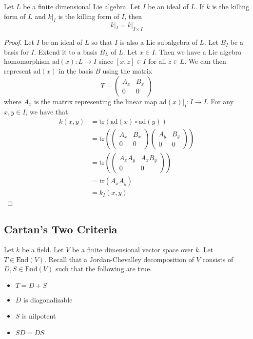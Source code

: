 \documentclass[a4paper]{article}
\begin{document}
\begin{lmm}{}{} Let $L$ be a finite dimensional Lie algebra. Let $I$ be an ideal of $L$. If $k$ is the killing form of $L$ and $k|_I$ is the killing form of $I$, then $$k|_I=k|_{I\times I}$$ \tcbline
\begin{proof}
Let $I$ be an ideal of $L$ so that $I$ is also a Lie subalgebra of $L$. Let $B_I$ be a basis for $I$. Extend it to a basis $B_L$ of $L$. Let $x\in I$. Then we have a Lie algebra homomorphism $\text{ad}(x):L\to I$ since $[x,z]\in I$ for all $z\in L$. We can then represent $\text{ad}(x)$ in the basis $B$ using the matrix $$T=\begin{pmatrix}
A_x & B_x\\
0 & 0
\end{pmatrix}$$ where $A_x$ is the matrix representing the linear map $\text{ad}(x)|_I:I\to I$. For any $x,y\in I$, we have that 
\begin{align*}
k(x,y)&=\text{tr}(\text{ad}(x)\circ\text{ad}(y))\\
&=\text{tr}\left(\begin{pmatrix}
A_x & B_x\\
0 & 0
\end{pmatrix}\begin{pmatrix}
A_y & B_y\\
0 & 0
\end{pmatrix}\right)\\
&=\text{tr}\left(\begin{pmatrix}
A_xA_y & A_xB_y\\
0 & 0
\end{pmatrix}\right)\\
&=\text{tr}(A_xA_y)\\
&=k_I(x,y)
\end{align*}
\end{proof}
\end{lmm}

\subsection{Cartan's Two Criteria}
Let $k$ be a field. Let $V$ be a finite dimensional vector space over $k$. Let $T\in\text{End}(V)$. Recall that a Jordan-Chevalley decomposition of $V$ consists of $D,S\in\text{End}(V)$ such that the following are true. 
\begin{itemize}
\item $T=D+S$
\item $D$ is diagonalizable
\item $S$ is nilpotent
\item $SD=DS$
\end{itemize}
\end{document}
